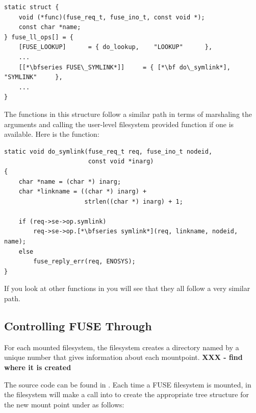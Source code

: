 \begin{lstlisting}
static struct {
    void (*func)(fuse_req_t, fuse_ino_t, const void *);
    const char *name;
} fuse_ll_ops[] = {
    [FUSE_LOOKUP]      = { do_lookup,    "LOOKUP"      },
    ...
    [[*\bfseries FUSE\_SYMLINK*]]     = { [*\bf do\_symlink*],     "SYMLINK"     },
    ...
}
\end{lstlisting}

\noindent
The  functions in this structure follow a similar path in terms of marshaling the arguments and calling the user-level filesystem provided function if one is available. Here is the  function:

\begin{lstlisting}
static void do_symlink(fuse_req_t req, fuse_ino_t nodeid, 
                       const void *inarg)
{   
    char *name = (char *) inarg;
    char *linkname = ((char *) inarg) + 
                      strlen((char *) inarg) + 1;
    
    if (req->se->op.symlink)
        req->se->op.[*\bfseries symlink*](req, linkname, nodeid, name);
    else
        fuse_reply_err(req, ENOSYS);   
}   
\end{lstlisting}

\noindent
If you look at other functions in  you will see that they all follow a very similar path.


\subsection{Controlling FUSE Through }\label{fusectl}

For each  mounted filesystem, the  filesystem creates a directory named by a unique number that gives information about each mountpoint. \textbf{XXX - find where it is created}

The  source code can be found in . Each time a FUSE filesystem is mounted,   in the  filesystem will make a call into  to create the appropriate tree structure for the new mount point under  as follows:

